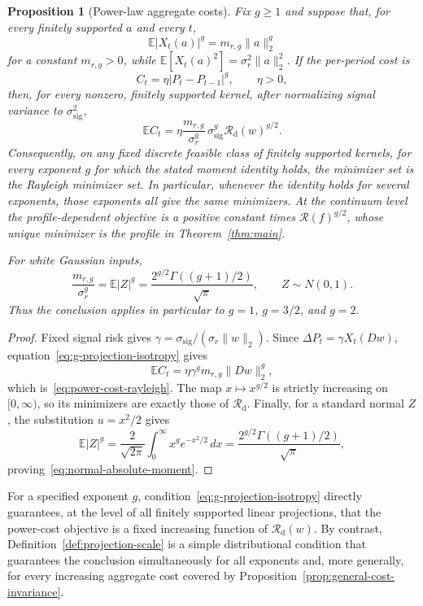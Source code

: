 \documentclass[11pt]{article}
\newtheorem{proposition}[theorem]{Proposition}
\theoremstyle{definition}
\theoremstyle{remark}
\newcommand{\Rcal}{\mathcal R}
\begin{document}
\begin{proposition}[Power-law aggregate costs]\label{prop:power-cost}
Fix $g\geq1$ and suppose that, for every finitely supported $a$ and every $t$,
\begin{equation}\label{eq:g-projection-isotropy}
 \mathbb E|X_t(a)|^g=m_{r,g}\|a\|_2^g
\end{equation}
for a constant $m_{r,g}>0$, while
$\mathbb E[X_t(a)^2]=\sigma_r^2\|a\|_2^2$. If the per-period cost is
\[
 C_t=\eta|P_t-P_{t-1}|^g,
 \qquad \eta>0,
\]
then, for every nonzero, finitely supported kernel, after normalizing signal
variance to $\sigma_{\mathrm{sig}}^2$,
\begin{equation}\label{eq:power-cost-rayleigh}
 \mathbb E C_t
 =\eta\frac{m_{r,g}}{\sigma_r^g}\,
     \sigma_{\mathrm{sig}}^g\Rcal_{\mathrm d}(w)^{g/2}.
\end{equation}
Consequently, on any fixed discrete feasible class of finitely supported
kernels, for every exponent $g$ for which the stated moment identity holds,
the minimizer set is the Rayleigh minimizer set. In particular, whenever the
identity holds for several exponents, those exponents all give the same
minimizers. At the continuum level the profile-dependent objective is
a positive constant times $\Rcal(f)^{g/2}$, whose unique minimizer is the
profile in Theorem~\ref{thm:main}.

For white Gaussian inputs,
\begin{equation}\label{eq:normal-absolute-moment}
 \frac{m_{r,g}}{\sigma_r^g}
 =\mathbb E|Z|^g
 =\frac{2^{g/2}\Gamma((g+1)/2)}{\sqrt\pi},
 \qquad Z\sim N(0,1).
\end{equation}
Thus the conclusion applies in particular to $g=1$, $g=3/2$, and $g=2$.
\end{proposition}
\begin{proof}
Fixed signal risk gives
$\gamma=\sigma_{\mathrm{sig}}/(\sigma_r\|w\|_2)$. Since
$\Delta P_t=\gamma X_t(Dw)$, equation~\eqref{eq:g-projection-isotropy} gives
\[
 \mathbb E C_t
 =\eta\gamma^gm_{r,g}\|Dw\|_2^g,
\]
which is~\eqref{eq:power-cost-rayleigh}. The map
$x\mapsto x^{g/2}$ is strictly increasing on $[0,\infty)$, so its minimizers
are exactly those of $\Rcal_{\mathrm d}$. Finally, for a standard normal $Z$,
the substitution $u=x^2/2$ gives
\[
 \mathbb E|Z|^g
 =\frac{2}{\sqrt{2\pi}}\int_0^\infty x^ge^{-x^2/2}\,dx
 =\frac{2^{g/2}\Gamma((g+1)/2)}{\sqrt\pi},
\]
proving~\eqref{eq:normal-absolute-moment}.
\end{proof}

For a specified exponent $g$, condition~\eqref{eq:g-projection-isotropy}
directly guarantees, at the level of all finitely supported linear
projections, that the power-cost objective is a fixed increasing function of
$\Rcal_{\mathrm d}(w)$. By contrast,
Definition~\ref{def:projection-scale} is a simple distributional condition
that guarantees the conclusion simultaneously for all exponents and, more
generally, for every increasing aggregate cost covered by
Proposition~\ref{prop:general-cost-invariance}.
\end{document}
